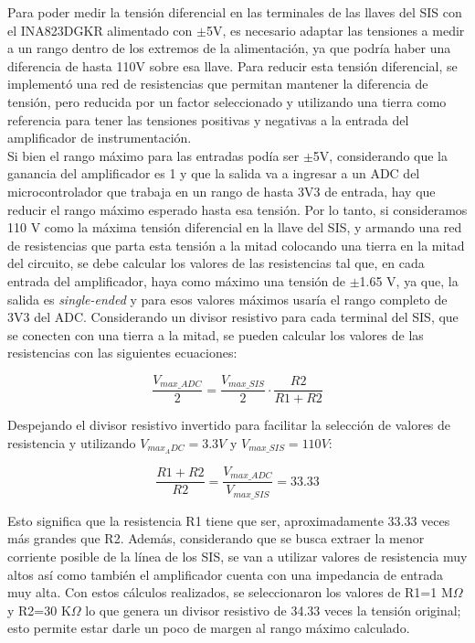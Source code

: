 Para poder medir la tensión diferencial en las terminales de las llaves del SIS con el INA823DGKR alimentado con $\pm$5V, es necesario adaptar las tensiones a medir a un rango dentro de los extremos de la alimentación, ya que podría haber una diferencia de hasta 110V sobre esa llave. Para reducir esta tensión diferencial, se implementó una red de resistencias que permitan mantener la diferencia de tensión, pero reducida por un factor seleccionado y utilizando una tierra como referencia para tener las tensiones positivas y negativas a la entrada del amplificador de instrumentación. \\ 

Si bien el rango máximo para las entradas podía ser $\pm$5V, considerando que la ganancia del amplificador es 1 y que la salida va a ingresar a un ADC del microcontrolador que trabaja en un rango de hasta 3V3 de entrada, hay que reducir el rango máximo esperado hasta esa tensión. Por lo tanto, si consideramos 110 V como la máxima tensión diferencial en la llave del SIS, y armando una red de resistencias que parta esta tensión a la mitad colocando una tierra en la mitad del circuito, se debe calcular los valores de las resistencias tal que, en cada entrada del amplificador, haya como máximo una tensión de $\pm$1.65 V, ya que, la salida es \textit{single-ended} y para esos valores máximos usaría el rango completo de 3V3 del ADC. Considerando un divisor resistivo para cada terminal del SIS, que se conecten con una tierra a la mitad, se pueden calcular los valores de las resistencias con las siguientes ecuaciones: 

\begin{equation}
    \frac{V_{max\_ADC}}{2} = \frac{V_{max\_SIS}}{2} \cdot \frac{R2}{R1 + R2}    
\end{equation}

Despejando el divisor resistivo invertido para facilitar la selección de valores de resistencia y utilizando $ V_{max_ADC}=3.3V$  y $V_{max\_SIS} = 110 V$: 

\begin{equation}
    \frac{R1 + R2}{R2}  = \frac{V_{max\_ADC}}{V_{max\_SIS}} = 33.33
\end{equation}

Esto significa que la resistencia R1 tiene que ser, aproximadamente 33.33 veces más grandes que R2. Además, considerando que se busca extraer la menor corriente posible de la línea de los SIS, se van a utilizar valores de resistencia muy altos así como también el amplificador cuenta con una impedancia de entrada muy alta. Con estos cálculos realizados, se seleccionaron los valores de R1=1 M$\Omega$ y R2=30 K$\Omega$ lo que genera un divisor resistivo de 34.33 veces la tensión original; esto permite estar darle un poco de margen al rango máximo calculado. \\



